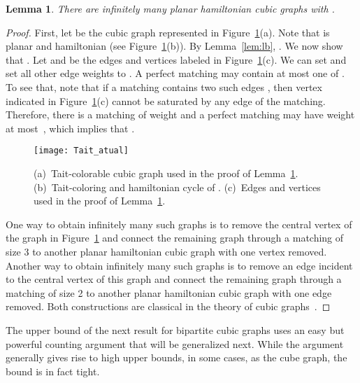 \documentclass{article}
\newtheorem{lem}[thm]{Lemma}
\begin{document}
\begin{lem} \label{lem:ub}
There are infinitely many planar hamiltonian cubic graphs  with .
\end{lem}
\begin{proof}
First, let  be the cubic graph represented in Figure~\ref{fig:tait13}(a). 
Note that  is planar and hamiltonian (see Figure~\ref{fig:tait13}(b)). 
By Lemma~\ref{lem:lb}, . We now show that . Let  and  be the edges and vertices labeled in Figure~\ref{fig:tait13}(c). 
We can set  and set all other edge weights to . 
A perfect matching may contain at most one of . 
To see that, note that if a matching contains two such edges , then vertex  indicated in Figure~\ref{fig:tait13}(c) cannot be saturated by any edge of the matching. 
Therefore, there is a matching  of weight  and a perfect matching may have weight at most~, which implies that .

\begin{figure}[ht]
\centering
\texttt{[image: Tait\_atual]}
\caption{(a)~Tait-colorable cubic graph  used in the proof of Lemma~\ref{lem:ub}. (b)~Tait-coloring and hamiltonian cycle of . (c)~Edges and vertices used in the proof of Lemma~\ref{lem:ub}.}
\label{fig:tait13}
\end{figure}

One way to obtain infinitely many such graphs is to remove the central vertex of the graph in Figure~\ref{fig:tait13} and connect the remaining graph through a matching of size 3 to another planar hamiltonian cubic graph with one vertex removed. Another way to obtain infinitely many such graphs is to remove an edge incident to the central vertex of this graph and connect the remaining graph through a matching of size 2 to another planar hamiltonian cubic graph with one edge removed. Both constructions are classical in the theory of cubic graphs~\cite{isaacs75}.
\end{proof}

The upper bound of the next result for bipartite cubic graphs uses an easy but powerful counting argument that will be generalized next. While the argument generally gives rise to high upper bounds, in some cases, as the cube graph, the bound is in fact tight.
\end{document}
